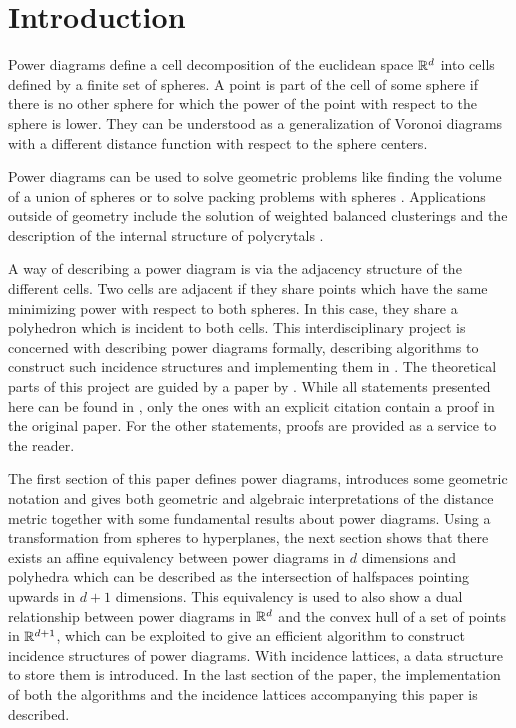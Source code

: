 \section{Introduction}
\label{sec:introduction}
Power diagrams define a cell decomposition of the euclidean space $\mathbb{R}^d$ into cells defined by a finite set of spheres.
A point is part of the cell of some sphere if there is no other sphere for which the power of the point with respect to the sphere is lower.
They can be understood as a generalization of Voronoi diagrams with a different distance function with respect to the sphere centers.

Power diagrams can be used to solve geometric problems like finding the volume of a union of spheres \cite{avis1988computing} or to solve packing problems with spheres \cite{toth2013lagerungen}.
Applications outside of geometry include the solution of weighted balanced clusterings \cite{brieden2012optimal} and the description of the internal structure of polycrytals \cite{alpers2015generalized}.

A way of describing a power diagram is via the adjacency structure of the different cells.
Two cells are adjacent if they share points which have the same minimizing power with respect to both spheres.
In this case, they share a polyhedron which is incident to both cells.
This interdisciplinary project is concerned with describing power diagrams formally, describing algorithms to construct such incidence structures and implementing them in \CC.
The theoretical parts of this project are guided by a paper by \textcite{aurenhammer1987power}.
While all statements presented here can be found in \cite{aurenhammer1987power}, only the ones with an explicit citation contain a proof in the original paper.
For the other statements, proofs are provided as a service to the reader.

The first section of this paper defines power diagrams, introduces some geometric notation and gives both geometric and algebraic interpretations of the distance metric together with some fundamental results about power diagrams.
Using a transformation from spheres to hyperplanes, the next section shows that there exists an affine equivalency between power diagrams in $d$ dimensions and polyhedra which can be described as the intersection of halfspaces pointing upwards in $d+1$ dimensions.
This equivalency is used to also show a dual relationship between power diagrams in $\mathbb{R}^d$ and the convex hull of a set of points in $\mathbb{R}^{d+1}$, which can be exploited to give an efficient algorithm to construct incidence structures of power diagrams.
With incidence lattices, a data structure to store them is introduced.
In the last section of the paper, the implementation of both the algorithms and the incidence lattices accompanying this paper is described.


